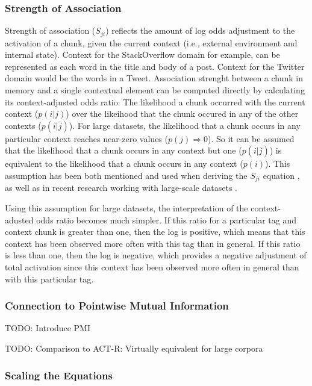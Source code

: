\documentclass[man]{apa6}
\begin{document}
\subsubsection{Strength of Association}

Strength of association ($S_{ji}$) reflects the amount of log odds adjustment to the activation of a chunk, given the current context (i.e., external environment and internal state).
Context for the StackOverflow domain for example, can be represented as each word in the title and body of a post.
Context for the Twitter domain would be the words in a Tweet.
Association strenght between a chunk in memory and a single contextual element can be computed directly by calculating its context-adjusted odds ratio:
The likelihood a chunk occurred with the current context ($p(i|j)$) over the likeihood that the chunk occured in any of the other contexts ($p(i|\overline{j})$).
For large datasets, the likelihood that a chunk occurs in any particular context reaches near-zero values ($p(j) \Rightarrow 0$).
So it can be assumed that the likelihood that a chunk occurs in any context but one ($p(i|\overline{j})$) is equivalent to the likelihood that a chunk occurs in any context ($p(i)$).
This assumption has been both mentioned and used when deriving the $S_{ji}$ equation \parencite{Anderson1989}, as well as in recent research working with large-scale datasets \parencite{Stanley2013}.

Using this assumption for large datasets, the interpretation of the context-adusted odds ratio becomes much simpler.
If this ratio for a particular tag and context chunk is greater than one, then the log is positive, which means that this context has been observed more often with this tag than in general.
If this ratio is less than one, then the log is negative, which provides a negative adjustment of total activation since this context has been observed more often in general than with this particular tag.

\subsubsection{Connection to Pointwise Mutual Information}

TODO: Introduce PMI \cite{Farahat2004}

TODO: Comparison to ACT-R: Virtually equivalent for large corpora \cite{Farahat2004}

\subsubsection{Scaling the Equations}
\end{document}
